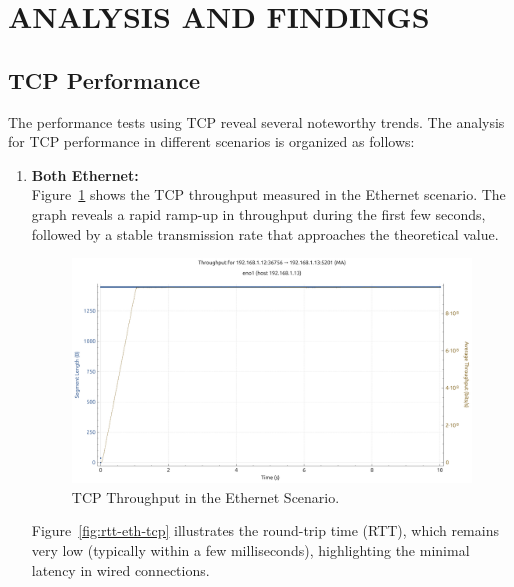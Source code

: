 \section{ANALYSIS AND FINDINGS} \label{sec:analysis-and-findings}

\subsection{TCP Performance} \label{subsec:tcp-performance}

The performance tests using TCP reveal several noteworthy trends. The analysis for TCP performance in different scenarios is organized as follows:

\begin{enumerate}
    \item \textbf{Both Ethernet:} \\
    Figure~\ref{fig:throughput-eth-tcp} shows the TCP throughput measured in the Ethernet scenario. The graph reveals a rapid ramp-up in throughput during the first few seconds, followed by a stable transmission rate that approaches the theoretical value.
    
    \begin{figure}[ht]
        \centering
        \includegraphics[width=0.9\columnwidth]{images/graphs/Throughput/Throughput_ETH_TCP.pdf}
        \caption{TCP Throughput in the Ethernet Scenario.}
        \label{fig:throughput-eth-tcp}
    \end{figure}

    Figure~\ref{fig:rtt-eth-tcp} illustrates the round-trip time (RTT), which remains very low (typically within a few milliseconds), highlighting the minimal latency in wired connections. 
    

\end{enumerate}
